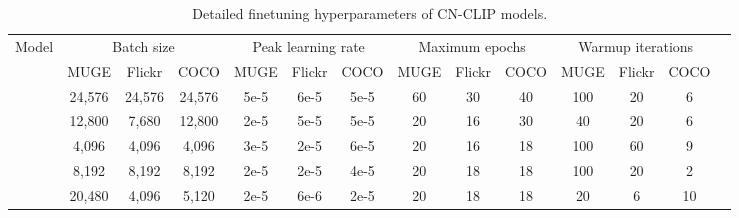 \documentclass[11pt]{article}
\begin{document}
\begin{table*}[t]
\center
\begin{adjustbox}{max width=1.\textwidth}
\begin{tabular}{@{\extracolsep{\fill}}lccccccccccccc}
\toprule
  \multirow{2}{*}{Model}
  & \multicolumn{3}{c}{Batch size}
  & \multicolumn{3}{c}{Peak learning rate}
  & \multicolumn{3}{c}{Maximum epochs}
  & \multicolumn{3}{c}{Warmup iterations}

  \\
  & MUGE
  & Flickr
  & COCO
  & MUGE
  & Flickr
  & COCO
  & MUGE
  & Flickr
  & COCO
  & MUGE
  & Flickr
  & COCO
  \\
\midrule
    
    & 24,576
    & 24,576
    & 24,576
    & 5e-5
    & 6e-5
    & 5e-5
    & 60
    & 30
    & 40
    & 100
    & 20
    & 6
    \\
    
    & 12,800
    & 7,680
    & 12,800
    & 2e-5
    & 5e-5
    & 5e-5
    & 20
    & 16
    & 30
    & 40
    & 20
    & 6
    \\
    
    & 4,096
    & 4,096
    & 4,096
    & 3e-5
    & 2e-5
    & 6e-5
    & 20
    & 16
    & 18
    & 100
    & 60
    & 9
    \\
    
    & 8,192
    & 8,192
    & 8,192
    & 2e-5
    & 2e-5
    & 4e-5
    & 20
    & 18
    & 18
    & 100
    & 20
    & 2
    \\
    
    & 20,480
    & 4,096
    & 5,120
    & 2e-5
    & 6e-6
    & 2e-5
    & 20
    & 18
    & 18
    & 20
    & 6
    & 10
    \\
\bottomrule
\end{tabular}
\end{adjustbox}
\caption{Detailed finetuning hyperparameters of CN-CLIP models.}
\label{tb:detailed_finetune}
\end{table*}
\end{document}
